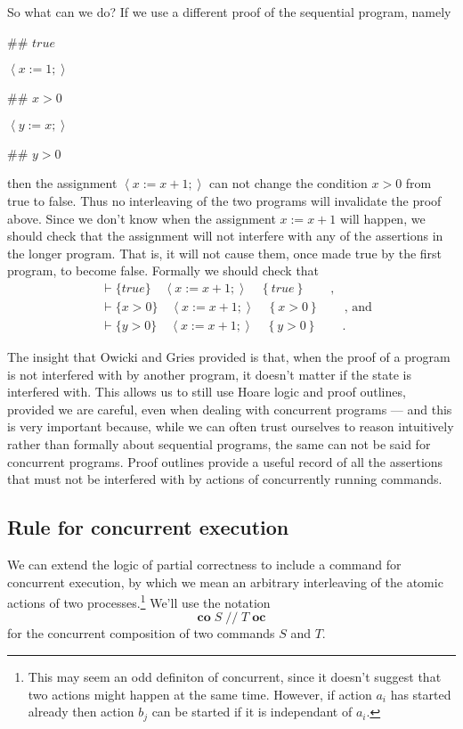 \documentclass[11pt]{article}%
\begin{document}
So what can we do? If we use a different proof of the sequential program, namely

\begin{code}
\#\# $\mathit{true}$

$\left\langle x:=1;\right\rangle $

\#\# $x>0$

$\left\langle y:=x;\right\rangle $

\#\# $y>0$
\end{code}

\noindent then the assignment $\left\langle x:=x+1;\right\rangle $ can not
change the condition $x>0$ from true to false. Thus no interleaving of the two
programs will invalidate the proof above. Since we don't know when the
assignment $x:=x+1$ will happen, we should check that the assignment will not
interfere with any of the assertions in the longer program. That is, it will
not cause them, once made true by the first program, to become false. Formally
we should check that%
\begin{align*}
&  \vdash\{\mathit{true}\}\quad\left\langle x:=x+1;\right\rangle \quad\left\{
\mathit{true}\right\}  \qquad\text{,}\\
&  \vdash\{x>0\}\quad\left\langle x:=x+1;\right\rangle \quad\left\{
x>0\right\}  \qquad\text{, and}\\
&  \vdash\{y>0\}\quad\left\langle x:=x+1;\right\rangle \quad\left\{
y>0\right\}  \qquad.
\end{align*}


The insight that Owicki and Gries provided is that, when the proof of a
program is not interfered with by another program, it doesn't matter if the
state is interfered with. This allows us to still use Hoare logic and proof
outlines, provided we are careful, even when dealing with concurrent programs
--- and this is very important because, while we can often trust ourselves to
reason intuitively rather than formally about sequential programs, the same
can not be said for concurrent programs. Proof outlines provide a useful
record of all the assertions that must not be interfered with by actions of
concurrently running commands.

\subsection{Rule for concurrent execution}

We can extend the logic of partial correctness to include a command for
concurrent execution, by which we mean an arbitrary interleaving of the atomic
actions of two processes.\footnote{This may seem an odd definiton of
concurrent, since it doesn't suggest that two actions might happen at the same
time. However, if action $a_{i}$ has started already then action $b_{j}$ can
be started if it is independant of $a_{i}$.} We'll use the notation%
\[
\mathbf{co}\;S\;//\;T\;\mathbf{oc}%
\]
for the concurrent composition of two commands $S$ and $T$.
\end{document}
